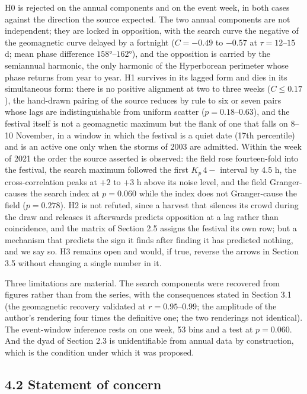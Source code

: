 \documentclass[
  10pt,
  a4paper,
]{article}
\begin{document}
H0 is rejected on the annual components and on the event week, in both
cases against the direction the source expected. The two annual
components are not independent; they are locked in opposition, with the
search curve the negative of the geomagnetic curve delayed by a
fortnight (\(C = -0.49\) to \(-0.57\) at \(\tau = 12\)--\(15\) d; mean
phase difference \(158°\)--\(162°\)), and the opposition is carried by
the semiannual harmonic, the only harmonic of the Hyperborean perimeter
whose phase returns from year to year. H1 survives in its lagged form
and dies in its simultaneous form: there is no positive alignment at two
to three weeks (\(C \le 0.17\)), the hand-drawn pairing of the source
reduces by rule to six or seven pairs whose lags are indistinguishable
from uniform scatter (\(p = 0.18\)--\(0.63\)), and the festival itself
is not a geomagnetic maximum but the flank of one that falls on 8--10
November, in a window in which the festival is a quiet date (17th
percentile) and is an active one only when the storms of 2003 are
admitted. Within the week of 2021 the order the source asserted is
observed: the field rose fourteen-fold into the festival, the search
maximum followed the first \(K_p\,4-\) interval by 4.5 h, the
cross-correlation peaks at \(+2\) to \(+3\) h above its noise level, and
the field Granger-causes the search index at \(p = 0.060\) while the
index does not Granger-cause the field (\(p = 0.278\)). H2 is not
refuted, since a harvest that silences its crowd during the draw and
releases it afterwards predicts opposition at a lag rather than
coincidence, and the matrix of Section 2.5 assigns the festival its own
row; but a mechanism that predicts the sign it finds after finding it
has predicted nothing, and we say so. H3 remains open and would, if
true, reverse the arrows in Section 3.5 without changing a single number
in it.

Three limitations are material. The search components were recovered
from figures rather than from the series, with the consequences stated
in Section 3.1 (the geomagnetic recovery validated at
\(r = 0.95\)--\(0.99\); the amplitude of the author's rendering four
times the definitive one; the two renderings not identical). The
event-window inference rests on one week, 53 bins and a test at
\(p = 0.060\). And the dyad of Section 2.3 is unidentifiable from annual
data by construction, which is the condition under which it was
proposed.

\hypertarget{statement-of-concern}{%
\subsection{4.2 Statement of concern}\label{statement-of-concern}}
\end{document}

